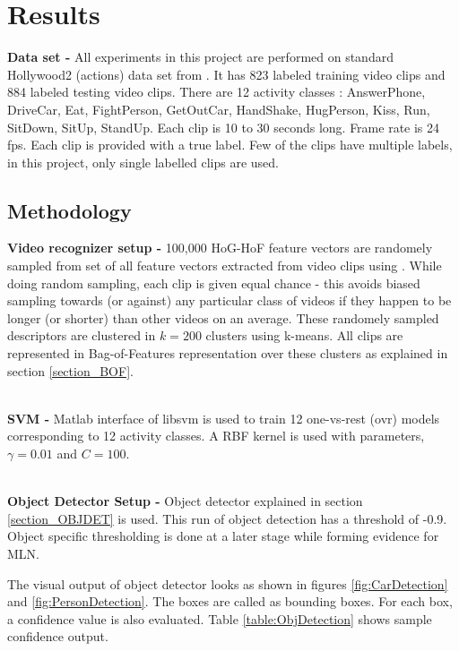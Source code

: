 \chapter{Results}

\label{ch5_RESULTS}
{\bf Data set - } All experiments in this project are performed on standard Hollywood2 (actions) 
\cite{hollywood2} data set from \cite{actionsInContext}. 
It has 823 labeled training video clips and 884 labeled testing video clips. 
There are 12 activity classes : AnswerPhone, DriveCar, Eat, FightPerson,
 GetOutCar, HandShake, HugPerson, Kiss, Run, SitDown, SitUp, StandUp.
 Each clip is 10 to 30 seconds long. Frame rate is 24 fps.
 Each clip is provided with a true label. Few of the clips have multiple labels, in this project, only single labelled clips are used.


 \section{Methodology}
 \label{section_METHODOLOGY}
 {\bf Video recognizer setup - } 100,000 HoG-HoF feature vectors are randomely sampled from 
 set of all feature vectors extracted from video clips using \cite{stipCode}.
 While doing random sampling, each clip is given equal chance - this avoids biased sampling
towards (or against) any particular class of videos if they happen to be longer (or shorter) than other videos on an average.
These randomely sampled descriptors are clustered in $k = 200$ clusters using k-means.
All clips are represented in Bag-of-Features representation over these clusters as explained in section \ref{section_BOF}.

~\\
{\bf SVM - } Matlab interface of libsvm \cite{libsvm} is used to train 
12 one-vs-rest (ovr) models corresponding to 12 activity classes. A RBF kernel is used with parameters, $\gamma = 0.01$ and $C = 100$.

~\\
{\bf Object Detector Setup - } Object detector explained in section \ref{section_OBJDET} is used. 
This run of object detection has a threshold of -0.9. 
Object specific thresholding is done at a later stage while forming evidence for MLN.

The visual output of object detector looks as shown in figures \ref{fig:CarDetection} and \ref{fig:PersonDetection}. 
The boxes are called as bounding boxes.
For each box, a confidence value is also evaluated.
Table \ref{table:ObjDetection} shows sample confidence output.

